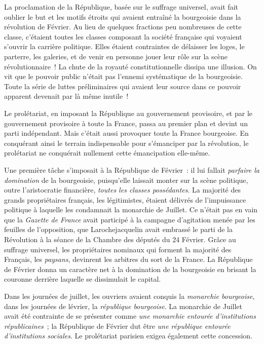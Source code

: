 \documentclass[twoside]{book} %
\begin{document}
\noindent La proclamation de la République, basée sur le suffrage universel, avait fait oublier le but et les motifs étroits qui avaient entraîné la bourgeoisie dans la révolution de Février. Au lieu de quelques fractions peu nombreuses de cette classe, c’étaient toutes les classes composant la société française qui voyaient s’ouvrir la carrière politique. Elles étaient contraintes de délaisser les loges, le parterre, les galeries, et de venir en personne jouer leur rôle sur la scène révolutionnaire ! La chute de la royauté constitutionnelle dissipa une illusion. On vit que le pouvoir public n’était pas l’ennemi systématique de la bourgeoisie. Toute la série de luttes préliminaires qui avaient leur source dans ce pouvoir apparent devenait par là même inutile !\par
Le prolétariat, en imposant la République au gouvernement provisoire, et par le gouvernement provisoire à toute la France, passa au premier plan et devint un parti indépendant. Mais c’était aussi provoquer toute la France bourgeoise. En conquérant ainsi le terrain indispensable pour s’émanciper par la révolution, le prolétariat ne conquérait nullement cette émancipation elle-même.\par
Une première tâche s’imposait à la République de Février : il lui fallait \emph{parfaire la domination} de la bourgeoisie, puisqu’elle laissait monter sur la scène politique, outre l’aristocratie financière, \emph{toutes les classes possédantes}. La majorité des grands propriétaires français, les légitimistes, étaient délivrés de l’impuissance politique à laquelle les condamnait la monarchie de Juillet. Ce n’était pas en vain que la \emph{Gazette de France} avait participé à la campagne d’agitation menée par les feuilles de l’opposition, que Larochejacquelin avait embrassé le parti de la Révolution à la séance de la Chambre des députés du 24 Février. Grâce au suffrage universel, les propriétaires nominaux qui forment la majorité des Français, les \emph{paysans}, devinrent les arbitres du sort de la France. La République de Février donna un caractère net à la domination de la bourgeoisie en brisant la couronne derrière laquelle se dissimulait le capital.\par
Dans les journées de juillet, les ouvriers avaient conquis la \emph{monarchie bourgeoise}, dans les journées de lévrier, la \emph{république bourgeoise}. La monarchie de Juillet avait été contrainte de se présenter comme \emph{une monarchie entourée d’institutions républicaines} ; la République de Février dut être \emph{une république entourée d’institutions sociales}. Le prolétariat parisien exigea également cette concession.\par
\end{document}
